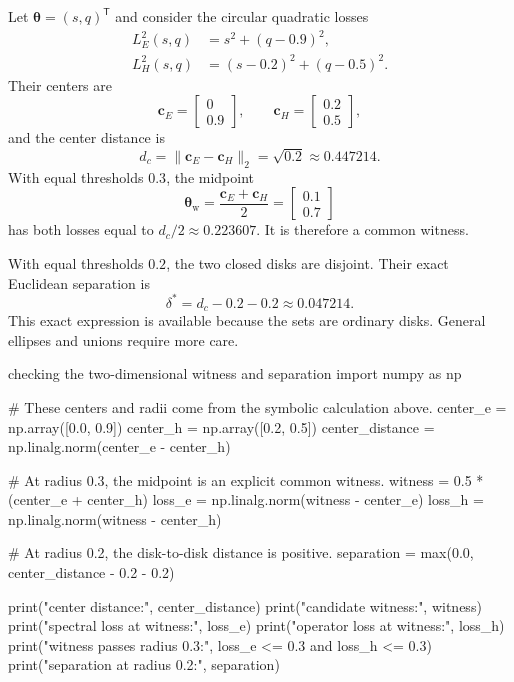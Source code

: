 Let $\boldsymbol\theta=(s,q)^{\mathsf T}$ and consider the circular quadratic
losses
\begin{align}
  L_E^2(s,q)&=s^2+(q-0.9)^2,\\
  L_H^2(s,q)&=(s-0.2)^2+(q-0.5)^2.
\end{align}
Their centers are
\begin{equation}
  \mathbf c_E=
  \begin{bmatrix}0\\0.9\end{bmatrix},
  \qquad
  \mathbf c_H=
  \begin{bmatrix}0.2\\0.5\end{bmatrix},
\end{equation}
and the center distance is
\begin{equation}
  d_c
  =
  \lVert\mathbf c_E-\mathbf c_H\rVert_2
  =
  \sqrt{0.2}
  \approx 0.447214.
\end{equation}
With equal thresholds $0.3$, the midpoint
\begin{equation}
  \boldsymbol\theta_{\mathrm w}
  =
  \frac{\mathbf c_E+\mathbf c_H}{2}
  =
  \begin{bmatrix}0.1\\0.7\end{bmatrix}
\end{equation}
has both losses equal to $d_c/2\approx0.223607$. It is therefore a common
witness.

With equal thresholds $0.2$, the two closed disks are disjoint. Their exact
Euclidean separation is
\begin{equation}
  \delta^{\ast}=d_c-0.2-0.2\approx0.047214.
\end{equation}
This exact expression is available because the sets are ordinary disks. General
ellipses and unions require more care.

\begin{pythonexample}{checking the two-dimensional witness and separation}
import numpy as np

# These centers and radii come from the symbolic calculation above.
center_e = np.array([0.0, 0.9])
center_h = np.array([0.2, 0.5])
center_distance = np.linalg.norm(center_e - center_h)

# At radius 0.3, the midpoint is an explicit common witness.
witness = 0.5 * (center_e + center_h)
loss_e = np.linalg.norm(witness - center_e)
loss_h = np.linalg.norm(witness - center_h)

# At radius 0.2, the disk-to-disk distance is positive.
separation = max(0.0, center_distance - 0.2 - 0.2)

print("center distance:", center_distance)
print("candidate witness:", witness)
print("spectral loss at witness:", loss_e)
print("operator loss at witness:", loss_h)
print("witness passes radius 0.3:", loss_e <= 0.3 and loss_h <= 0.3)
print("separation at radius 0.2:", separation)
\end{pythonexample}

